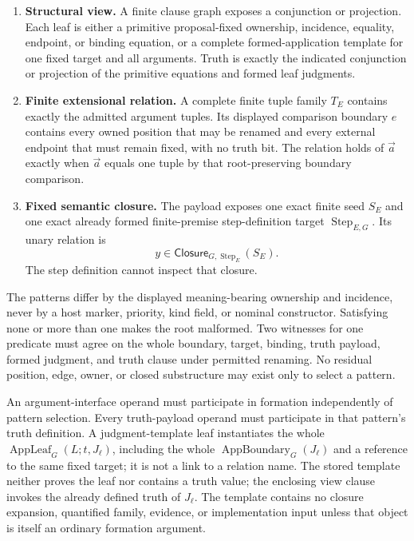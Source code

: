 \documentclass[11pt,twoside]{article}
\newcommand{\Closure}{\mathsf{Closure}}
\begin{document}
\begin{enumerate}[leftmargin=2.2em]
  \item \textbf{Structural view.}  A finite clause graph exposes a conjunction or
        projection.  Each leaf is either a primitive proposal-fixed ownership,
        incidence, equality, endpoint, or binding equation, or a complete
        formed-application template for one fixed target and all arguments.
        Truth is exactly the indicated conjunction or projection of the primitive
        equations and formed leaf judgments.
  \item \textbf{Finite extensional relation.}  A complete finite tuple family
        \(T_E\) contains exactly the admitted argument tuples.  Its displayed
        comparison boundary \(e\) contains every owned position that may be
        renamed and every external endpoint that must remain fixed, with no truth
        bit.  The relation holds of \(\vec a\) exactly when \(\vec a\) equals one
        tuple by that root-preserving boundary comparison.
  \item \textbf{Fixed semantic closure.}  The payload exposes one exact finite seed
        \(S_E\) and one exact already formed finite-premise step-definition target
        \(\operatorname{Step}_{E,G}\).  Its unary relation is
        \[
          y\in\Closure_{G,\operatorname{Step}_E}(S_E).
        \]
        The step definition cannot inspect that closure.
\end{enumerate}

The patterns differ by the displayed meaning-bearing ownership and incidence,
never by a host marker, priority, kind field, or nominal constructor.  Satisfying
none or more than one makes the root malformed.  Two witnesses for one predicate
must agree on the whole boundary, target, binding, truth payload, formed judgment,
and truth clause under permitted renaming.  No residual position, edge, owner, or
closed substructure may exist only to select a pattern.

An argument-interface operand must participate in formation independently of
pattern selection.  Every truth-payload operand must participate in that pattern's
truth definition.  A judgment-template leaf instantiates the whole
\(\operatorname{AppLeaf}_G(L;t,J_\ell)\), including the whole
\(\operatorname{AppBoundary}_G(J_\ell)\) and a reference to the same fixed target;
it is not a link to a relation name.  The stored template neither proves the leaf
nor contains a truth value; the enclosing view clause invokes the already defined
truth of \(J_\ell\).  The template contains no closure expansion, quantified
family, evidence, or implementation input unless that object is itself an
ordinary formation argument.
\end{document}
